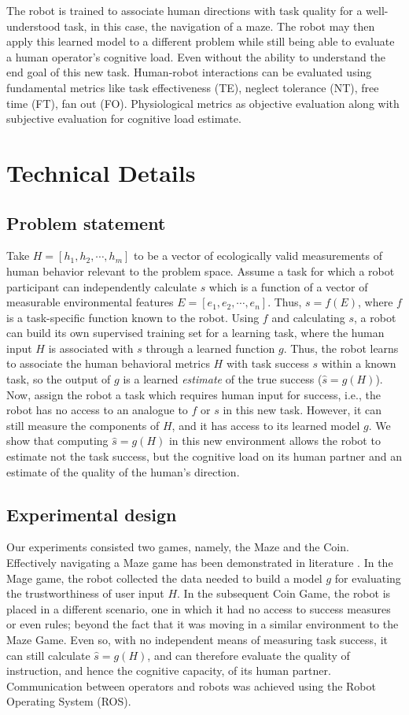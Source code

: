 \documentclass{sig-alternate}
\begin{document}
The robot is trained to associate human directions with task quality for a well-understood task, in this case, the
navigation of a maze. The robot may then apply this learned model to a
different problem while still being able to evaluate a human operator's
cognitive load. Even without the ability to understand the end goal of this
new task. Human-robot interactions can be evaluated using fundamental metrics
\cite{olsen2003metrics} like task effectiveness (TE), neglect tolerance (NT), free time (FT), fan out (FO).
Physiological metrics as objective evaluation along with subjective evaluation for cognitive load estimate\cite{Brookings1996361}.

\section{Technical Details} \subsection{Problem statement} Take $H=[h_1,h_2,\cdots,h_m]$ to be a vector of ecologically
valid measurements of human behavior relevant to the problem space.  Assume a task for which a robot participant can
independently calculate $s$ which is a function of a vector of measurable environmental features
$E=[e_1,e_2,\cdots,e_n]$.  Thus, $s = f(E)$, where $f$ is a task-specific function known to the robot.  Using $f$ and
calculating $s$, a robot can build its own supervised training set for a learning task, where the human input $H$ is
associated with $s$ through a learned function $g$.  Thus, the robot learns to associate the human behavioral metrics
$H$ with task success $s$ within a known task, so the output of $g$ is a learned \emph{estimate} of the true success
($\hat{s}=g(H)$).  Now, assign the robot a task which requires human input for success, i.e., the robot has no access to
an analogue to $f$ or $s$ in this new task.  However, it can still measure the components of $H$, and it has access to
its learned model $g$.  We show that computing $\hat{s}=g(H)$ in this new environment allows the robot to estimate not
the task success, but the cognitive load on its human partner and an estimate of the quality of the human's direction.
\subsection{Experimental design} Our experiments consisted two games, namely, the Maze and the Coin. Effectively
navigating a Maze game has been demonstrated in literature \cite{crick2011human}. In the Mage game, the robot collected
the data needed to build a model $g$ for evaluating the trustworthiness of user input $H$. In the subsequent Coin Game,
the robot is placed in a different scenario, one in which it had no access to success measures or even rules; beyond the
fact that it was moving in a similar environment to the Maze Game. Even so, with no independent means of measuring task
success, it can still calculate $\hat{s}=g(H)$, and can therefore evaluate the quality of instruction, and hence the
cognitive capacity, of its human partner. Communication between operators and robots was achieved using the Robot Operating System (ROS).
\end{document}
